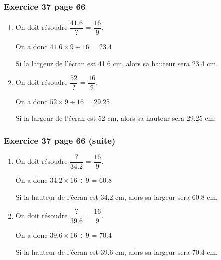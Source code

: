 \documentclass[xcolor={dvipsnames}]{beamer}
\begin{document}
\begin{frame}
	\frametitle{Exercice 37 page 66}
	
	\begin{Large}
		\begin{enumerate}
			
			\item On doit résoudre $\dfrac{\num{41.6}}{?} $ = $\dfrac{16}{9}$. \pause %
			
			On a donc $\num{41.6} \times 9 \div 16 $ \pause = \num{23.4} %
			
			Si la largeur de l'écran est \num{41.6} cm, alors sa hauteur sera \num{23.4} cm.
			
			\vspace*{1cm}
			
			\item On doit résoudre $\dfrac{\num{52}}{?} $ = $\dfrac{16}{9}$. %
			
			On a donc $\num{52} \times 9 \div 16 $  = \num{29.25} %
			
			Si la largeur de l'écran est \num{52} cm, alors sa hauteur sera \num{29.25} cm.
			
			
		\end{enumerate}
	\end{Large}
	
\end{frame}


\begin{frame}
	\frametitle{Exercice 37 page 66 (suite)}
	
	\begin{Large}
		\begin{enumerate}
			

			
			\item On doit résoudre $\dfrac{?}{\num{34.2}} $ = $\dfrac{16}{9}$. \pause %
			
			On a donc $\num{34.2} \times 16 \div 9 $ \pause = \num{60.8} %
			
			Si la hauteur de l'écran est \num{34.2} cm, alors sa largeur sera \num{60.8} cm.
			
			\vspace*{1cm}
			
			\item On doit résoudre $\dfrac{?}{\num{39.6}} $ = $\dfrac{16}{9}$. %
			
			On a donc $\num{39.6} \times 16 \div 9 $ = \num{70.4} %
			
			Si la hauteur de l'écran est \num{39.6} cm, alors sa largeur sera \num{70.4} cm.
		\end{enumerate}
	\end{Large}
	
\end{frame}
\end{document}
